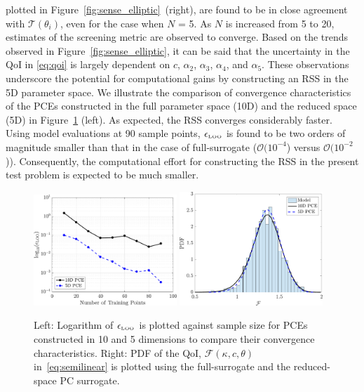 plotted in Figure~\ref{fig:sense_elliptic}~(right), are found to
be in close agreement with $\mathcal{T}(\theta_i)$, even for the case when $N$ = 5. As $N$
is increased from 5 to 20, estimates of the screening metric are observed to converge.
Based on the trends observed in Figure~\ref{fig:sense_elliptic}, it can be said that
the uncertainty in the QoI in \eqref{eq:qoi} is largely dependent on $c$, 
$\alpha_2$, $\alpha_3$, $\alpha_4$, and $\alpha_5$. These observations underscore the
potential for computational gains by constructing an RSS in the 5D parameter space. We 
illustrate the comparison of convergence characteristics of the PCEs constructed in the
full parameter space (10D) and the reduced space (5D) in Figure~\ref{fig:conv_elliptic} (left). 
As expected, the RSS converges considerably faster. Using model evaluations at 90
sample points, $\epsilon_{\mbox{\tiny{LOO}}}$ is found to be two orders of magnitude
smaller than that in the case of full-surrogate ($\mathcal{O}(10^{-4}$) versus
$\mathcal{O}(10^{-2}$)). 
Consequently, the computational effort for constructing the RSS in the present test problem
is expected to be much smaller. 
%
\begin{figure}[htbp]
 \begin{center}
  \includegraphics[width=0.48\textwidth]{./Figures/err_samples_elliptic}
  \includegraphics[width=0.48\textwidth]{./Figures/pdf_comp_elliptic}
\caption{Left: Logarithm of $\epsilon_{\mbox{\tiny{LOO}}}$ is plotted against sample size for 
PCEs constructed in 10 and 5 dimensions to compare their convergence characteristics. 
Right: PDF of the QoI, $\mathcal{F}(\kappa, c, \theta)$ in~\eqref{eq:semilinear} is
plotted using the full-surrogate and the reduced-space PC surrogate.}
\label{fig:conv_elliptic}
\end{center}
\end{figure}

